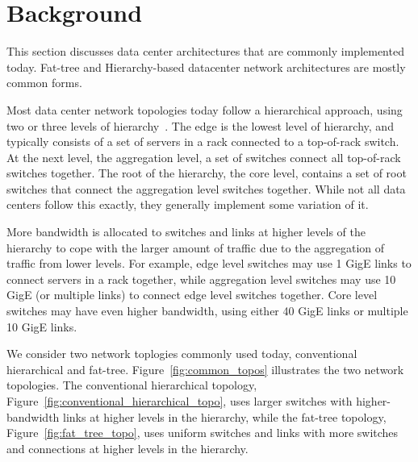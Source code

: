 \vspace{-0.1in}
\section{Background}
\label{sec:background}

This section discusses data center architectures that are commonly implemented today. Fat-tree and Hierarchy-based datacenter network architectures are mostly common forms.

Most data center network topologies today follow a hierarchical approach, using two or three levels of hierarchy~\cite{Al-Fares:2008:SCD}.  The edge is the lowest level of hierarchy, and typically consists of a set of servers in a rack connected to a top-of-rack switch.  At the next level, the aggregation level, a set of switches connect all top-of-rack switches together.  The root of the hierarchy, the core level, contains a set of root switches that connect the aggregation level switches together.  While not all data centers follow this exactly, they generally implement some variation of it.

More bandwidth is allocated to switches and links at higher levels of the hierarchy to cope with the larger amount of traffic due to the aggregation of traffic from lower levels.  For example, edge level switches may use 1 GigE links to connect servers in a rack together, while aggregation level switches may use 10 GigE (or multiple links) to connect edge level switches together.  Core level switches may have even higher bandwidth, using either 40 GigE links or multiple 10 GigE links.

We consider two network toplogies commonly used today, conventional hierarchical and fat-tree.  Figure~\ref{fig:common_topos} illustrates the two network topologies.  The conventional hierarchical topology, Figure~\ref{fig:conventional_hierarchical_topo}, uses larger switches with higher-bandwidth links at higher levels in the hierarchy, while the fat-tree topology, Figure~\ref{fig:fat_tree_topo}, uses uniform switches and links with more switches and connections at higher levels in the hierarchy.


